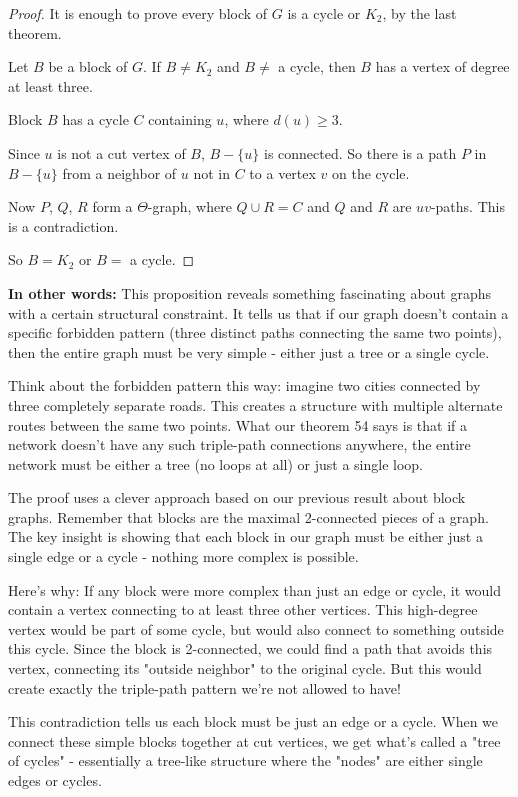 \documentclass{article}
\theoremstyle{definition}
\begin{document}
\begin{proof}
It is enough to prove every block of $G$ is a cycle or $K_2$, by the last theorem.

Let $B$ be a block of $G$. If $B \neq K_2$ and $B \neq$ a cycle, then $B$ has a vertex of degree at least three.

Block $B$ has a cycle $C$ containing $u$, where $d(u) \geq 3$.

Since $u$ is not a cut vertex of $B$, $B - \{u\}$ is connected. So there is a path $P$ in $B - \{u\}$ from a neighbor of $u$ not in $C$ to a vertex $v$ on the cycle.

Now $P$, $Q$, $R$ form a $\Theta$-graph, where $Q \cup R = C$ and $Q$ and $R$ are $uv$-paths. This is a contradiction.

So $B = K_2$ or $B =$ a cycle.
\end{proof}

\medskip
\noindent\textbf{In other words:} This proposition reveals something fascinating about graphs with a certain structural constraint. It tells us that if our graph doesn't contain a specific forbidden pattern (three distinct paths connecting the same two points), then the entire graph must be very simple - either just a tree or a single cycle.

Think about the forbidden pattern this way: imagine two cities connected by three completely separate roads. This creates a structure with multiple alternate routes between the same two points. What our theorem 54 says is that if a network doesn't have any such triple-path connections anywhere, the entire network must be either a tree (no loops at all) or just a single loop.

The proof uses a clever approach based on our previous result about block graphs. Remember that blocks are the maximal 2-connected pieces of a graph. The key insight is showing that each block in our graph must be either just a single edge or a cycle - nothing more complex is possible.

Here's why: If any block were more complex than just an edge or cycle, it would contain a vertex connecting to at least three other vertices. This high-degree vertex would be part of some cycle, but would also connect to something outside this cycle. Since the block is 2-connected, we could find a path that avoids this vertex, connecting its "outside neighbor" to the original cycle. But this would create exactly the triple-path pattern we're not allowed to have!

This contradiction tells us each block must be just an edge or a cycle. When we connect these simple blocks together at cut vertices, we get what's called a "tree of cycles" - essentially a tree-like structure where the "nodes" are either single edges or cycles.
\end{document}
